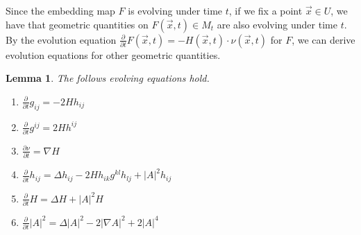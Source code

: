 \documentclass[a4paper]{report}
\newtheorem{lemma}{Lemma}
\theoremstyle{remark}
\begin{document}
Since the embedding map $F$ is evolving under time $t$, if we fix a point $\vec{x} \in U$, we have that geometric quantities on $F(\vec{x},t) \in M_t$ are also evolving under time $t$. By the evolution equation $\frac{\partial }{\partial t} F(\vec{x},t)=-H(\vec{x},t) \cdot \nu (\vec{x},t)$ for $F$, we can derive evolution equations for other geometric quantities.

\begin{lemma}
	The follows evolving equations hold.
	\begin{enumerate}

		\item $\frac{\partial }{\partial t} g_{ij}=-2Hh_{ij}$
		\item $\frac{\partial }{\partial t} g^{ij}=2Hh^{ij}$
		\item $\frac{\partial \nu }{\partial t} = \nabla H$
		\item $\frac{\partial }{\partial t} h_{ij}=\Delta h_{ij}-2Hh_{ik}g^{kl}h_{lj}+\left| A \right| ^2 h_{ij}$
		\item $\frac{\partial }{\partial t} H=\Delta H+ \left| A \right| ^2 H$
		\item $\frac{\partial }{\partial t} \left| A \right| ^2 = \Delta \left| A \right| ^2 - 2 \left| \nabla A \right| ^2 + 2 \left| A \right| ^4$
	\end{enumerate}
\end{lemma}
\end{document}
